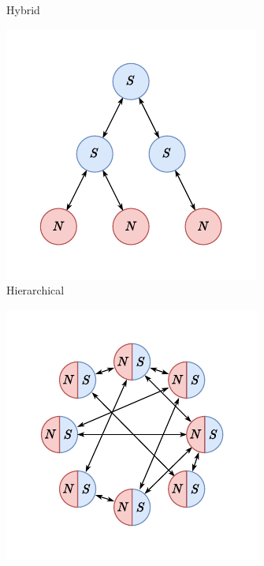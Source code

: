 \begin{figure}
\begin{subfigure}{.25\textwidth}
    \caption{Hybrid}
    \label{fig:cids.hybrid}
  \end{subfigure}%
  \begin{subfigure}{.25\textwidth}
    \centering
    \includegraphics[width=\textwidth]{figures/topo-hierarchical}
    \caption{Hierarchical}
    \label{fig:cids.hierarchical}
  \end{subfigure}%
  \begin{subfigure}{.25\textwidth}
    \centering
    \includegraphics[width=\textwidth]{figures/topo-distributed}

\end{subfigure}
\end{figure}
